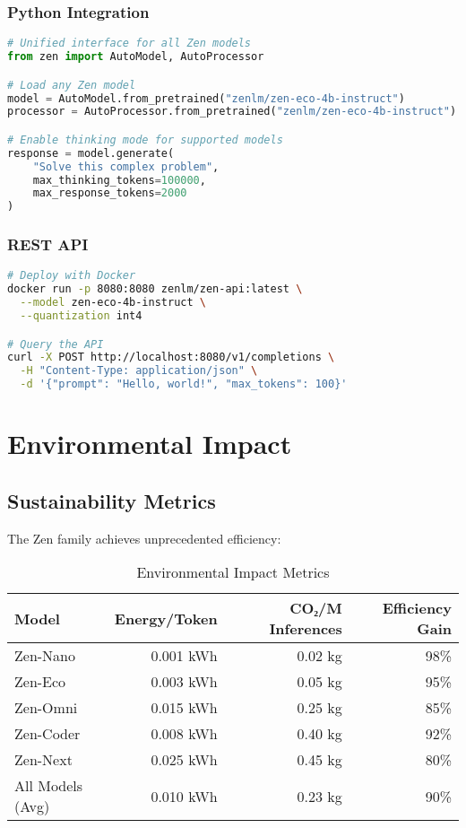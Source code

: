 \documentclass[11pt,a4paper]{article}
\begin{document}
\subsubsection{Python Integration}
\begin{lstlisting}[language=Python]
# Unified interface for all Zen models
from zen import AutoModel, AutoProcessor

# Load any Zen model
model = AutoModel.from_pretrained("zenlm/zen-eco-4b-instruct")
processor = AutoProcessor.from_pretrained("zenlm/zen-eco-4b-instruct")

# Enable thinking mode for supported models
response = model.generate(
    "Solve this complex problem",
    max_thinking_tokens=100000,
    max_response_tokens=2000
)
\end{lstlisting}

\subsubsection{REST API}
\begin{lstlisting}[language=bash]
# Deploy with Docker
docker run -p 8080:8080 zenlm/zen-api:latest \
  --model zen-eco-4b-instruct \
  --quantization int4

# Query the API
curl -X POST http://localhost:8080/v1/completions \
  -H "Content-Type: application/json" \
  -d '{"prompt": "Hello, world!", "max_tokens": 100}'
\end{lstlisting}

\section{Environmental Impact}

\subsection{Sustainability Metrics}

The Zen family achieves unprecedented efficiency:

\begin{table}[H]
\centering
\begin{tabular}{lrrr}
\toprule
\textbf{Model} & \textbf{Energy/Token} & \textbf{CO₂/M Inferences} & \textbf{Efficiency Gain} \\
\midrule
Zen-Nano & 0.001 kWh & 0.02 kg & 98\% \\
Zen-Eco & 0.003 kWh & 0.05 kg & 95\% \\
Zen-Omni & 0.015 kWh & 0.25 kg & 85\% \\
Zen-Coder & 0.008 kWh & 0.40 kg & 92\% \\
Zen-Next & 0.025 kWh & 0.45 kg & 80\% \\
All Models (Avg) & 0.010 kWh & 0.23 kg & 90\% \\
\bottomrule
\end{tabular}
\caption{Environmental Impact Metrics}
\end{table}
\end{document}
